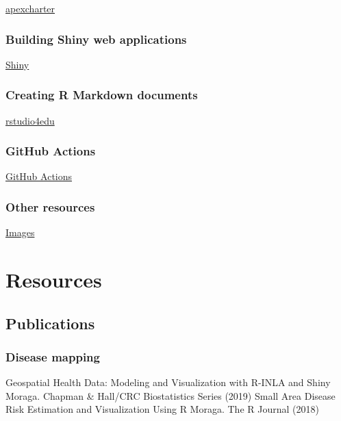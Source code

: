 \documentclass[
  letterpaper,
  DIV=11,
  numbers=noendperiod]{scrreprt}
\begin{document}
\href{https://dreamrs.github.io/apexcharter/}{apexcharter}

\hypertarget{building-shiny-web-applications}{%
\section{Building Shiny web
applications}\label{building-shiny-web-applications}}

\href{https://shiny.posit.co/}{Shiny}

\hypertarget{creating-r-markdown-documents}{%
\section{Creating R Markdown
documents}\label{creating-r-markdown-documents}}

\href{https://rstudio4edu.github.io/rstudio4edu-book/rmd-fancy.html}{rstudio4edu}

\hypertarget{github-actions}{%
\section{GitHub Actions}\label{github-actions}}

\href{https://rfortherestofus.com/2023/05/github-actions}{GitHub
Actions}

\hypertarget{other-resources}{%
\section{Other resources}\label{other-resources}}

\href{https://unsplash.com/}{Images}

\part{Resources}

\hypertarget{publications}{%
\chapter{Publications}\label{publications}}

\hypertarget{disease-mapping-1}{%
\section{Disease mapping}\label{disease-mapping-1}}

Geospatial Health Data: Modeling and Visualization with R-INLA and Shiny
Moraga. Chapman \& Hall/CRC Biostatistics Series (2019) Small Area
Disease Risk Estimation and Visualization Using R Moraga. The R Journal
(2018)
\end{document}
